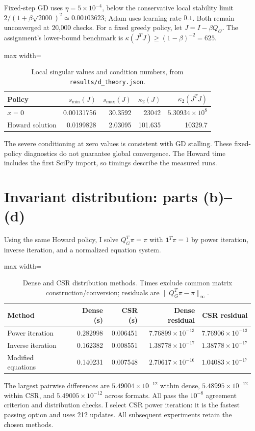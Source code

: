 \documentclass[10pt]{article}
\begin{document}
Fixed-step GD uses $\eta=5\times10^{-4}$, below the conservative local stability
limit $2/(1+\beta\sqrt{2000})^2\simeq0.00103623$; Adam uses learning rate $0.1$.
Both remain unconverged at 20,000 checks. For a fixed greedy policy, let
$J=I-\beta Q_G$. The assignment's lower-bound benchmark is
$\kappa(J^TJ)\geq(1-\beta)^{-2}=625$.
\begin{table}[H]\centering\small
\caption{Local singular values and condition numbers, from \texttt{results/d\_theory.json}.}\label{tab:conditioning}
\begin{adjustbox}{max width=\linewidth}
\begin{tabular}{lrrrr}
\toprule
Policy & $s_{\min}(J)$ & $s_{\max}(J)$ & $\kappa_2(J)$ & $\kappa_2(J^TJ)$ \\
\midrule
$x=0$ & 0.00131756 & 30.3592 & 23042 & $5.30934\times10^{8}$ \\
Howard solution & 0.0199828 & 2.03095 & 101.635 & 10329.7 \\
\bottomrule
\end{tabular}
\end{adjustbox}\end{table}
The severe conditioning at zero values is consistent with GD stalling. These
fixed-policy diagnostics do not guarantee global convergence. The Howard time
includes the first SciPy import, so timings describe the measured runs.

\section{Invariant distribution: parts (b)--(d)}
Using the same Howard policy, I solve $Q_G^T\pi=\pi$ with $\mathbf1^T\pi=1$
by power iteration, inverse iteration, and a normalized equation system.
\begin{table}[H]\centering\small
\caption{Dense and CSR distribution methods. Times exclude common matrix construction/conversion; residuals are $\|Q_G^T\pi-\pi\|_\infty$.}\label{tab:distributions}
\begin{adjustbox}{max width=\linewidth}
\begin{tabular}{lrrrr}
\toprule
Method & Dense (s) & CSR (s) & Dense residual & CSR residual \\
\midrule
Power iteration & 0.282998 & 0.006451 & $7.76899\times10^{-13}$ & $7.76906\times10^{-13}$ \\
Inverse iteration & 0.162382 & 0.008551 & $1.38778\times10^{-17}$ & $1.38778\times10^{-17}$ \\
Modified equations & 0.140231 & 0.007548 & $2.70617\times10^{-16}$ & $1.04083\times10^{-17}$ \\
\bottomrule
\end{tabular}
\end{adjustbox}\end{table}
The largest pairwise differences are $5.49004\times10^{-12}$ within dense,
$5.48995\times10^{-12}$ within CSR, and $5.49005\times10^{-12}$ across formats.
All pass the $10^{-8}$ agreement criterion and distribution checks. I select
CSR power iteration: it is the fastest passing option and uses 212 updates.
All subsequent experiments retain the chosen methods.
\end{document}
